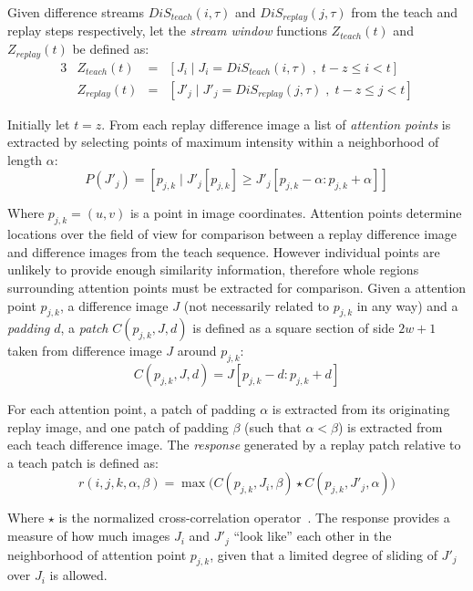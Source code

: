 \documentclass[twocolumn, 9pt,fleqn]{jsproceedings}
\begin{document}
Given difference streams $DiS_{teach}(i, \tau)$ and $DiS_{replay}(j, \tau)$ from the teach and replay steps respectively, let the \textit{stream window} functions $Z_{teach}(t)$ and $Z_{replay}(t)$ be defined as:
\begin{alignat}{3}
& Z_{teach}(t) & = & [J_i \; | \; J_i = DiS_{teach}(i, \tau) \; , \; t - z \leq i < t] \\
& Z_{replay}(t) & = & [J'_j \; | \; J'_j = DiS_{replay}(j, \tau) \; , \; t - z \leq j < t]
\end{alignat}

Initially let $t = z$. From each replay difference image a list of \textit{attention points} is extracted by selecting points of maximum intensity within a neighborhood of length $\alpha$:
\begin{equation}
P(J'_j) = [p_{j,k} \; | \; J'_j[p_{j,k}] \geq J'_j[p_{j,k} - \alpha : p_{j,k} + \alpha ]]
\end{equation}

Where $p_{j,k} = (u, v)$ is a point in image coordinates. Attention points determine locations over the field of view for comparison between a replay difference image and difference images from the teach sequence. However individual points are unlikely to provide enough similarity information, therefore whole regions surrounding attention points must be extracted for comparison. Given a attention point $p_{j,k}$, a difference image $J$ (not necessarily related to $p_{j,k}$ in any way) and a \textit{padding} $d$, a \textit{patch} $C(p_{j,k}, J, d)$ is defined as a square section of side $2w+1$ taken from difference image $J$ around $p_{j,k}$:
\begin{equation}
C(p_{j,k}, J, d) = J[p_{j,k} - d : p_{j,k} + d]
\end{equation}

For each attention point, a patch of padding $\alpha$ is extracted from its originating replay image, and one patch of padding $\beta$ (such that $\alpha < \beta$) is extracted from each teach difference image. The \textit{response} generated by a replay patch relative to a teach patch is defined as:
\begin{equation}
r(i, j, k, \alpha, \beta) = \max \big( C(p_{j,k}, J_i, \beta) \star C(p_{j,k}, J'_j, \alpha) \big)
\end{equation}

Where $\star$ is the normalized cross-correlation operator~\cite{HEL14b}. The response provides a measure of how much images $J_i$ and $J'_j$ ``look like'' each other in the neighborhood of attention point $p_{j,k}$, given that a limited degree of sliding of $J'_j$ over $J_i$ is allowed.
\end{document}
